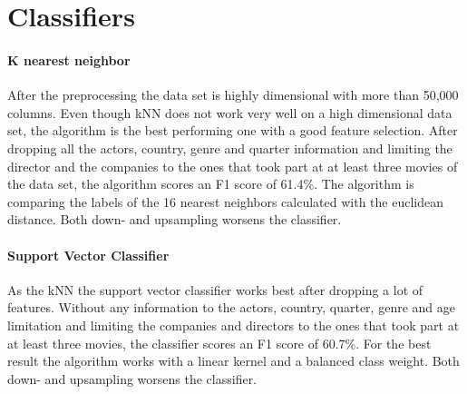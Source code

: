 \section {Classifiers}
\paragraph{K nearest neighbor}
After the preprocessing the data set is highly dimensional with more than 50,000 columns. Even though kNN does not work very well on a high dimensional data set, the algorithm is the best performing one with a good feature selection. After dropping all the actors, country, genre and quarter information and limiting the director and the companies to the ones that took part at at least three movies of the data set, the algorithm scores an F1 score of 61.4\%. The algorithm is comparing the labels of the 16 nearest neighbors calculated with the euclidean distance. Both down- and upsampling worsens the classifier. 

\paragraph{Support Vector Classifier}
As the kNN the support vector classifier works best after dropping a lot of features. Without any information to the actors, country, quarter, genre and age limitation and limiting the companies and directors to the ones that took part at at least three movies, the classifier scores an F1 score of 60.7\%. For the best result the algorithm works with a linear kernel and a balanced class weight. Both down- and upsampling worsens the classifier.


